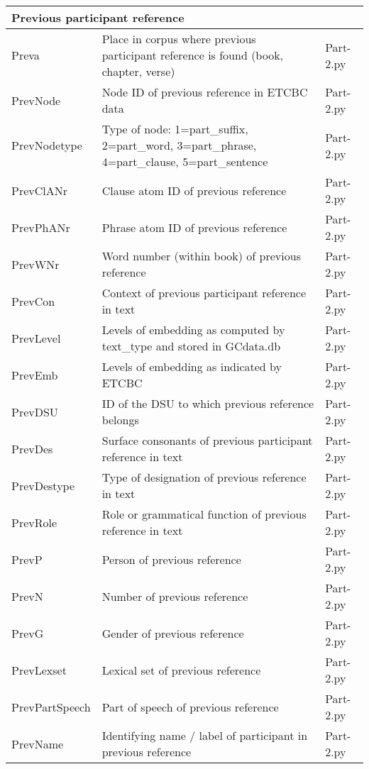 \documentclass{article}
\begin{document}
\begin{longtable}{|l|p{}|l|}
\multicolumn{3}{|l|}{\bf{Previous participant reference}} \\ \hline

Preva & Place in corpus where previous participant reference is found (book, chapter, verse) & Part-2.py \\ \hline
PrevNode & Node ID of previous reference in ETCBC data & Part-2.py \\ \hline
PrevNodetype & Type of node: 1=part\_suffix, 2=part\_word, 3=part\_phrase, 4=part\_clause, 5=part\_sentence & Part-2.py \\ \hline
PrevClANr & Clause atom ID of previous reference & Part-2.py \\ \hline
PrevPhANr & Phrase atom ID of previous reference & Part-2.py \\ \hline
PrevWNr & Word number (within book) of previous reference & Part-2.py \\ \hline
PrevCon & Context of previous participant reference in text &  Part-2.py\\ \hline
PrevLevel & Levels of embedding as computed by text\_type and stored in GCdata.db & Part-2.py \\ \hline
PrevEmb & Levels of embedding as indicated by ETCBC & Part-2.py \\ \hline
PrevDSU & ID of the DSU to which previous reference belongs & Part-2.py \\ \hline
PrevDes & Surface consonants of previous participant reference in text & Part-2.py \\ \hline
PrevDestype & Type of designation of previous reference in text & Part-2.py \\ \hline
PrevRole & Role or grammatical function of previous reference in text & Part-2.py \\ \hline
PrevP & Person of previous reference & Part-2.py \\ \hline
PrevN & Number of previous reference & Part-2.py \\ \hline
PrevG & Gender of previous reference & Part-2.py \\ \hline
PrevLexset & Lexical set of previous reference & Part-2.py \\ \hline
PrevPartSpeech & Part of speech of previous reference & Part-2.py \\ \hline
PrevName & Identifying name / label of participant in previous reference & Part-2.py \\ \hline


\end{longtable}
\end{document}
